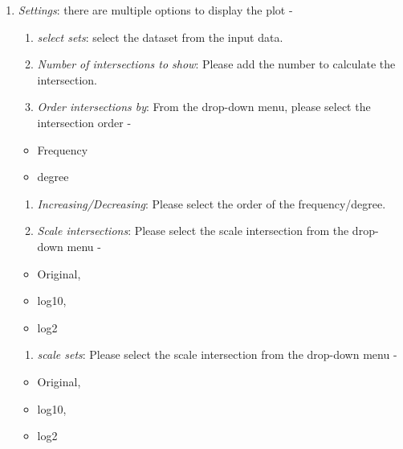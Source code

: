 \documentclass[
  a4paper,
  DIV=11,
  numbers=noendperiod,
  oneside,
  open=any]{scrreport}
\providecommand{\tightlist}{%
  \setlength{\itemsep}{0pt}\setlength{\parskip}{0pt}}\usepackage{longtable,booktabs,array}
\begin{document}
\begin{enumerate}
\def\labelenumi{\arabic{enumi}.}
\setcounter{enumi}{1}
\item
  \emph{Settings}: there are multiple options to display the plot -

  \begin{enumerate}
  \def\labelenumii{\roman{enumii}.}
  \item
    \emph{select sets}: select the dataset from the input data.
  \item
    \emph{Number of intersections to show}: Please add the number to
    calculate the intersection.
  \item
    \emph{Order intersections by}: From the drop-down menu, please
    select the intersection order -
  \end{enumerate}

  \begin{itemize}
  \tightlist
  \item
    Frequency
  \item
    degree
  \end{itemize}

  \begin{enumerate}
  \def\labelenumii{\roman{enumii}.}
  \setcounter{enumii}{3}
  \item
    \emph{Increasing/Decreasing}: Please select the order of the
    frequency/degree.
  \item
    \emph{Scale intersections}: Please select the scale intersection
    from the drop-down menu -
  \end{enumerate}

  \begin{itemize}
  \tightlist
  \item
    Original,
  \item
    log10,
  \item
    log2
  \end{itemize}

  \begin{enumerate}
  \def\labelenumii{\roman{enumii}.}
  \setcounter{enumii}{5}
  \tightlist
  \item
    \emph{scale sets}: Please select the scale intersection from the
    drop-down menu -
  \end{enumerate}

  \begin{itemize}
  \tightlist
  \item
    Original,
  \item
    log10,
  \item
    log2
  \end{itemize}


\end{enumerate}
\end{document}
